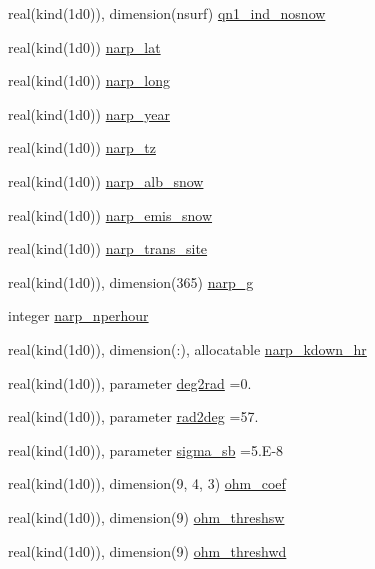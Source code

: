 \begin{DoxyCompactItemize}
real(kind(1d0)), dimension(nsurf) \hyperlink{namespaceallocatearray_a098df5ee70b2d0e75e10d6a2af40b6a2}{qn1\+\_\+ind\+\_\+nosnow}
\item 
real(kind(1d0)) \hyperlink{namespaceallocatearray_a7b5080e39a3fff641d0430e27a214f73}{narp\+\_\+lat}
\item 
real(kind(1d0)) \hyperlink{namespaceallocatearray_a4cead817e8c2a1093714592c8fd4647c}{narp\+\_\+long}
\item 
real(kind(1d0)) \hyperlink{namespaceallocatearray_abd08fc8e7202cd8df8d0989842b0b5a6}{narp\+\_\+year}
\item 
real(kind(1d0)) \hyperlink{namespaceallocatearray_a273ce22e21b65f11ee34d94178fb83d8}{narp\+\_\+tz}
\item 
real(kind(1d0)) \hyperlink{namespaceallocatearray_a74f3fec744807c8f27837cb556e268ee}{narp\+\_\+alb\+\_\+snow}
\item 
real(kind(1d0)) \hyperlink{namespaceallocatearray_a87a39d461e1ca42ee5eec5e53f9be96c}{narp\+\_\+emis\+\_\+snow}
\item 
real(kind(1d0)) \hyperlink{namespaceallocatearray_aa57823a8cf6ecf5dd9831b5e713405a5}{narp\+\_\+trans\+\_\+site}
\item 
real(kind(1d0)), dimension(365) \hyperlink{namespaceallocatearray_a8c88a2f2cc3c9a8e17a46321db44dda9}{narp\+\_\+g}
\item 
integer \hyperlink{namespaceallocatearray_a4ade212246deb8928d13ab60941f568d}{narp\+\_\+nperhour}
\item 
real(kind(1d0)), dimension(\+:), allocatable \hyperlink{namespaceallocatearray_a4866b7da54272d82fa9edc9ae61e1ea8}{narp\+\_\+kdown\+\_\+hr}
\item 
real(kind(1d0)), parameter \hyperlink{namespaceallocatearray_a2e733560c2b2c287dce276bfb7eb32db}{deg2rad} =0.
\item 
real(kind(1d0)), parameter \hyperlink{namespaceallocatearray_a7d3aff15bbe8e1dec4e224f4fa5b244f}{rad2deg} =57.
\item 
real(kind(1d0)), parameter \hyperlink{namespaceallocatearray_a91279585f00cf4382f539354751bf02f}{sigma\+\_\+sb} =5.\+E-\/8
\item 
real(kind(1d0)), dimension(9, 4, 3) \hyperlink{namespaceallocatearray_aa455ec06de0d5f8b24b5a991a07b32c1}{ohm\+\_\+coef}
\item 
real(kind(1d0)), dimension(9) \hyperlink{namespaceallocatearray_a8b9a218b05df6fa11170f787d62e5ed4}{ohm\+\_\+threshsw}
\item 
real(kind(1d0)), dimension(9) \hyperlink{namespaceallocatearray_a138caba870c7f698f4b833e019b2c794}{ohm\+\_\+threshwd}

\end{DoxyCompactItemize}
